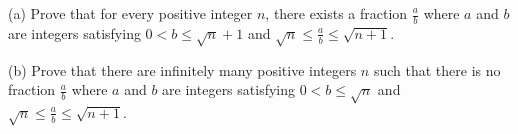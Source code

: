(a) Prove that for every positive integer $n$, there exists a fraction $\frac{a}{b}$ where $a$ and $b$ are integers satisfying $0 < b \leq \sqrt{n} + 1$ and $\sqrt{n} \leq \frac{a}{b} \leq \sqrt{n+1}$.

(b) Prove that there are infinitely many positive integers $n$ such that there is no fraction $\frac{a}{b}$ where $a$ and $b$ are integers satisfying $0 < b \leq \sqrt{n}$ and $\sqrt{n} \leq \frac{a}{b} \leq \sqrt{n+1}$.
